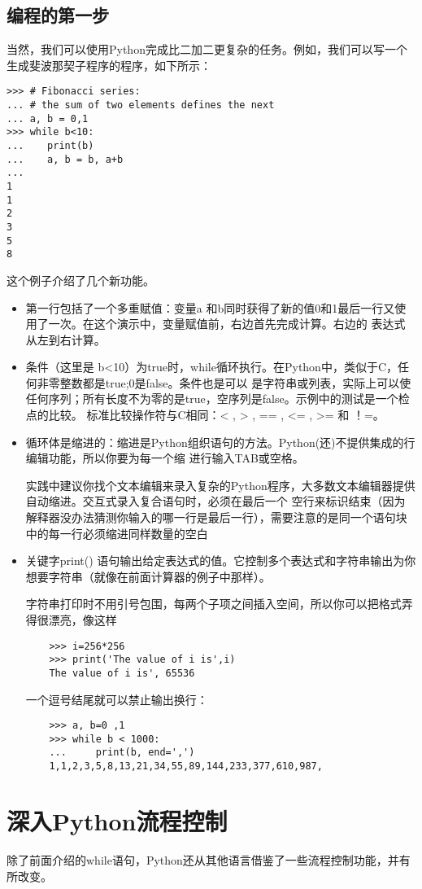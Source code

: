 \documentclass[UTF8]{ctexart}
\begin{document}
\subsection{编程的第一步}
当然，我们可以使用Python完成比二加二更复杂的任务。例如，我们可以写一个生成斐波那契子程序的程序，如下所示：
\begin{verbatim}
>>> # Fibonacci series:
... # the sum of two elements defines the next
... a, b = 0,1
>>> while b<10:
...    print(b)
...    a, b = b, a+b
...
1
1
2
3
5
8
\end{verbatim}

这个例子介绍了几个新功能。
\begin{itemize}
  \item 第一行包括了一个多重赋值：变量a 和b同时获得了新的值0和1最后一行又使用了一次。在这个演示中，变量赋值前，右边首先完成计算。右边的
  表达式从左到右计算。
  \item 条件（这里是 b<10）为true时，while循环执行。在Python中，类似于C，任何非零整数都是true;0是false。条件也是可以
  是字符串或列表，实际上可以使任何序列；所有长度不为零的是true，空序列是false。示例中的测试是一个检点的比较。
  标准比较操作符与C相同：< , > , == , <= , >= 和 ！=。
  \item 循环体是缩进的：缩进是Python组织语句的方法。Python(还)不提供集成的行编辑功能，所以你要为每一个缩
  进行输入TAB或空格。

  实践中建议你找个文本编辑来录入复杂的Python程序，大多数文本编辑器提供自动缩进。交互式录入复合语句时，必须在最后一个
  空行来标识结束（因为解释器没办法猜测你输入的哪一行是最后一行），需要注意的是同一个语句块中的每一行必须缩进同样数量的空白
  \item 关键字print() 语句输出给定表达式的值。它控制多个表达式和字符串输出为你想要字符串（就像在前面计算器的例子中那样）。

  字符串打印时不用引号包围，每两个子项之间插入空间，所以你可以把格式弄得很漂亮，像这样
  \begin{verbatim}
    >>> i=256*256
    >>> print('The value of i is',i)
    The value of i is', 65536
  \end{verbatim}

  一个逗号结尾就可以禁止输出换行：
  \begin{verbatim}
    >>> a, b=0 ,1
    >>> while b < 1000:
    ...     print(b, end=',')
    1,1,2,3,5,8,13,21,34,55,89,144,233,377,610,987,
  \end{verbatim}
\end{itemize}

\section{深入Python流程控制}
除了前面介绍的while语句，Python还从其他语言借鉴了一些流程控制功能，并有所改变。
\end{document}

